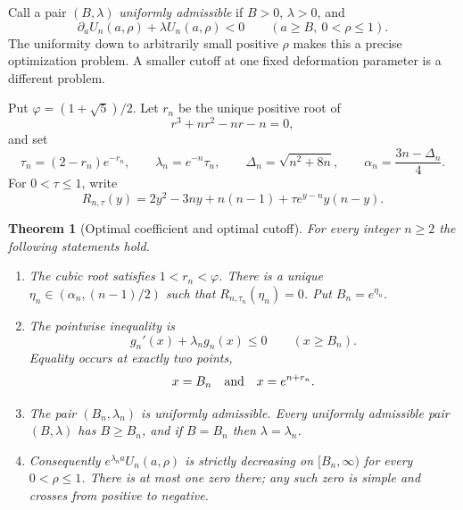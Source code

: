 \documentclass[11pt,a4paper]{article}
\newtheorem{theorem}{Theorem}[section]
\theoremstyle{definition}
\theoremstyle{remark}
\numberwithin{equation}{section}
\begin{document}
Call a pair $(B,\lambda)$ \emph{uniformly admissible} if $B>0$,
$\lambda>0$, and
\begin{equation}\label{opt:eq:admissible}
 \partial_aU_n(a,\rho)+\lambda U_n(a,\rho)<0
 \qquad(a\geq B,\ 0<\rho\leq1).
\end{equation}
The uniformity down to arbitrarily small positive $\rho$ makes this a
precise optimization problem. A smaller cutoff at one fixed deformation
parameter is a different problem.

Put $\varphi=(1+\sqrt5)/2$. Let $r_n$ be the unique positive root of
\begin{equation}\label{opt:eq:cubic}
 r^3+nr^2-nr-n=0,
\end{equation}
and set
\begin{equation}\label{opt:eq:lambda}
 \tau_n=(2-r_n)e^{-r_n},\qquad \lambda_n=e^{-n}\tau_n,
 \qquad \Delta_n=\sqrt{n^2+8n},\qquad
 \alpha_n=\frac{3n-\Delta_n}{4}.
\end{equation}
For $0<\tau\leq1$, write
\begin{equation}\label{opt:eq:R}
 R_{n,\tau}(y)=2y^2-3ny+n(n-1)+\tau e^{y-n}y(n-y).
\end{equation}

\begin{theorem}[Optimal coefficient and optimal cutoff]
\label{opt:thm:optimal}
For every integer $n\geq2$ the following statements hold.
\begin{enumerate}
\item The cubic root satisfies $1<r_n<\varphi$. There is a unique
 $\eta_n\in(\alpha_n,(n-1)/2)$ such that
 $R_{n,\tau_n}(\eta_n)=0$. Put $B_n=e^{\eta_n}$.
\item The pointwise inequality is
 \begin{equation}\label{opt:eq:pointwise}
  g_n'(x)+\lambda_n g_n(x)\leq0\qquad(x\geq B_n).
 \end{equation}
 Equality occurs at exactly two points,
 \begin{equation}\label{opt:eq:equality-points}
  x=B_n\quad\hbox{and}\quad x=e^{n+r_n}.
 \end{equation}
\item The pair $(B_n,\lambda_n)$ is uniformly admissible. Every
 uniformly admissible pair $(B,\lambda)$ has $B\geq B_n$, and if
 $B=B_n$ then $\lambda=\lambda_n$.
\item Consequently $e^{\lambda_n a}U_n(a,\rho)$ is strictly decreasing
 on $[B_n,\infty)$ for every $0<\rho\leq1$. There is at most one
 zero there; any such zero is simple and crosses from positive to
 negative.
\end{enumerate}
\end{theorem}
\end{document}
